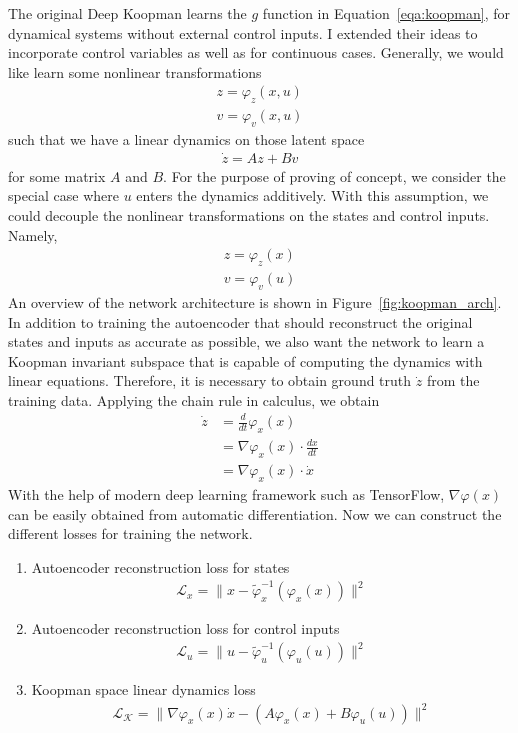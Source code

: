 \documentclass[10pt,twocolumn]{article}
\begin{document}
The original Deep Koopman \cite{deepkoopman} learns the $g$ function in
Equation~\ref{eqa:koopman}, for dynamical systems without external control inputs.
I extended their ideas to incorporate control variables as well as for continuous cases.
Generally, we would like learn some nonlinear transformations
\begin{gather}
  z = \varphi_z(x, u) \\
  v = \varphi_v(x, u)
\end{gather}
such that we have a linear dynamics on those latent space
\begin{gather}
  \dot{z} = Az + Bv
\end{gather}
for some matrix $A$ and $B$. For the purpose of proving of concept, we consider
the special case where $u$ enters the dynamics additively.
With this assumption, we could decouple the nonlinear transformations on the states and
control inputs. Namely,
\begin{gather}
  z = \varphi_z(x) \\
  v = \varphi_v(u)
\end{gather}
An overview of the network architecture is shown in Figure~\ref{fig:koopman_arch}. In
addition to training the autoencoder that should reconstruct the original states and inputs
as accurate as possible, we also want the network to learn a Koopman invariant subspace
that is capable of computing the dynamics with linear equations. Therefore, it is necessary
to obtain ground truth $\dot{z}$ from the training data. Applying the chain rule in
calculus, we obtain
\begin{equation}
  \begin{aligned}
    \dot{z} &= \frac{d}{dt} \varphi_x(x) \\
            &= \nabla \varphi_x(x) \cdot \frac{dx}{dt} \\
            &= \nabla \varphi_x(x) \cdot \dot{x}
  \end{aligned}
\end{equation}
With the help of modern deep learning framework such as TensorFlow, $\nabla \varphi(x)$ can
be easily obtained from automatic differentiation. Now we can construct the different losses
for training the network.
\begin{enumerate}
  \item Autoencoder reconstruction loss for states
    \begin{gather}
      \mathcal{L}_x = \| x - \tilde{\varphi}_x^{-1}(\varphi_x(x)) \|^2
    \end{gather}

  \item Autoencoder reconstruction loss for control inputs
    \begin{gather}
      \mathcal{L}_u = \| u - \tilde{\varphi}_u^{-1}(\varphi_u(u)) \|^2
    \end{gather}

  \item Koopman space linear dynamics loss
    \begin{gather}
      \mathcal{L}_{\mathcal{K}} = \| \nabla \varphi_x(x) \dot{x} -
                                     (A\varphi_x(x) + B\varphi_u(u) ) \|^2
    \end{gather}
\end{enumerate}
\end{document}
